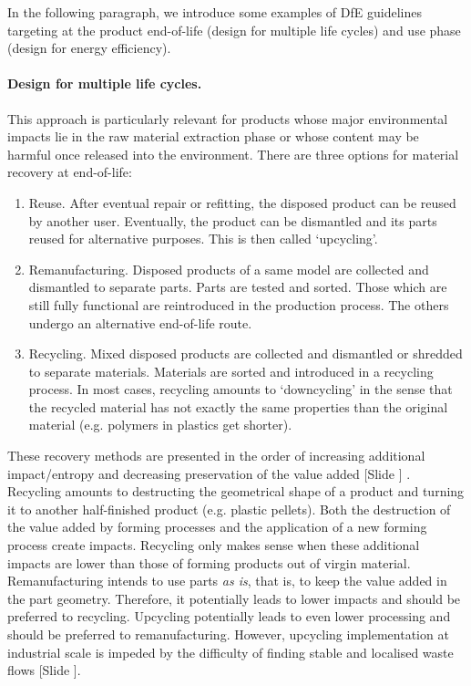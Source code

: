 \documentclass{article}
\newcounter{slide}
\begin{document}
In the following paragraph, we introduce some examples of DfE guidelines targeting at the product end-of-life (design for multiple life cycles) and use phase (design for energy efficiency).

\paragraph{Design for multiple life cycles.}
\label{sec:DfR}
This approach is particularly relevant for products whose major environmental impacts lie in the raw material extraction phase or whose content may be harmful once released into the environment. There are three options for material recovery at end-of-life:
\begin{enumerate}
	\item Reuse. After eventual repair or refitting, the disposed product can be reused by another user. Eventually, the product can be dismantled and its parts reused for alternative purposes. This is then called `upcycling'. 
	\item Remanufacturing. Disposed products of a same model are collected and dismantled to separate parts. Parts are tested and sorted. Those which are still fully functional are reintroduced in the production process. The others undergo an alternative end-of-life route.
	\item Recycling. Mixed disposed products are collected and dismantled or shredded to separate materials. Materials are sorted and introduced in a recycling process. In most cases, recycling amounts to `downcycling' in the sense that the recycled material has not exactly the same properties than the original material (e.g. polymers in plastics get shorter).
\end{enumerate}
These recovery methods are presented in the order of increasing additional impact/entropy and decreasing preservation of the value added {\color{blue}[Slide ]} \cite{mihelcicSustainabilityScienceEngineering2003}. Recycling amounts to destructing the geometrical shape of a product and turning it to another half-finished product (e.g. plastic pellets). Both the destruction of the value added by forming processes and the application of a new forming process create impacts. Recycling only makes sense when these additional impacts are lower than those of forming products out of virgin material. Remanufacturing intends to use parts \emph{as is}, that is, to keep the value added in the part geometry. Therefore, it potentially leads to lower impacts and should be preferred to recycling. Upcycling potentially leads to even lower processing and should be preferred to remanufacturing. However, upcycling implementation at industrial scale is impeded by the difficulty of finding stable and localised waste flows {\color{blue}[Slide ]}.
\end{document}
